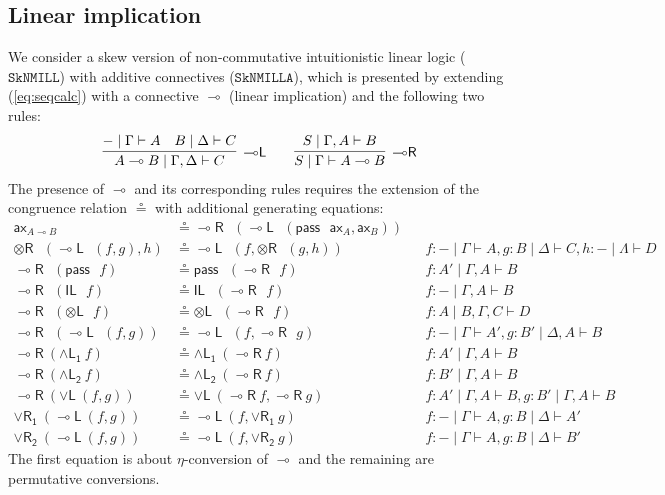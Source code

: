 \documentclass[submission,copyright,creativecommons]{eptcs}
\theoremstyle{definition}
\newcommand{\tl}{\otimes \mathsf{L}}
\newcommand{\tr}{\otimes \mathsf{R}}
\newcommand{\lright}{{\multimap}\mathsf{R}}
\newcommand{\lleft}{{\multimap}\mathsf{L}}
\newcommand{\pass}{\mathsf{pass}}
\newcommand{\unitl}{\mathsf{IL}}
\newcommand{\andlone}{\land \mathsf{L_{1}}}
\newcommand{\andltwo}{\land \mathsf{L_{2}}}
\newcommand{\orl}{\lor \mathsf{L}}
\newcommand{\orrone}{\lor \mathsf{R_{1}}}
\newcommand{\orrtwo}{\lor \mathsf{R_{2}}}
\newcommand{\ax}{\mathsf{ax}}
\newcommand{\lolli}{\multimap}
\newcommand{\SkNMILL}{$\mathtt{SkNMILL}$}
\newcommand{\SkNMILLA}{$\mathtt{SkNMILLA}$}
\begin{document}
\subsection{Linear implication}\label{subsec:impl}
We consider a skew version of non-commutative intuitionistic linear logic (\SkNMILL) with additive connectives (\SkNMILLA), which is presented by extending (\ref{eq:seqcalc}) with a connective $\lolli$ (linear implication) and the following two rules:
\begin{displaymath}
  \begin{array}{c}
    \infer[\lleft]{A \lolli B \mid \Gamma , \Delta \vdash C}{
      - \mid \Gamma \vdash A
      &
      B \mid \Delta \vdash C
    }
    \qquad
    \infer[\lright]{S \mid \Gamma \vdash A \lolli B}{S \mid \Gamma , A \vdash B}
  \end{array}
\end{displaymath}
The presence of $\lolli$ and its corresponding rules requires the extension of the congruence relation $\circeq$ with additional generating equations:
\begin{equation}\label{fig:circeq:impl}
  \begin{array}{rlll}
  \ax_{A \lolli B} &\circeq \lright \text{ } (\lleft \text{ } (\pass \text{ } \ax_{A}, \ax_{B} ))
  \\
  \tr \text{ } (\lleft \text{ } (f , g), h) & \circeq \lleft \text{ } (f, \tr \text{ } (g, h)) &&f: {-} \mid \Gamma \vdash A, g : B \mid \Delta \vdash C, h : {-} \mid \Lambda \vdash D
  \\
  \lright \text{ } (\pass \text{ } f) &\circeq \pass \text{ } (\lright \text{ } f) &&f : A' \mid \Gamma , A \vdash B
  \\
  \lright \text{ } (\unitl \text{ } f) &\circeq \unitl \text{ } (\lright \text{ } f) &&f : {-} \mid \Gamma , A \vdash B
  \\
  \lright \text{ } (\tl \text{ } f) &\circeq \tl \text{ } (\lright \text{ } f) &&f : A \mid B , \Gamma , C \vdash D
  \\
  \lright \text{ } (\lleft \text{ } (f, g)) &\circeq \lleft \text{ } (f, \lright \text{ } g) &&f : {-} \mid \Gamma \vdash A', g : B' \mid \Delta , A \vdash B
  \\
  \lright \ (\andlone \ f) &\circeq \andlone \ (\lright \ f) &&f : A' \mid \Gamma , A \vdash B
  \\
  \lright \ (\andltwo \ f) &\circeq \andltwo \ (\lright \ f) &&f : B' \mid \Gamma , A \vdash B
  \\
  \lright \ (\orl \ (f ,g)) &\circeq \orl \ (\lright \ f , \lright \ g) &&f : A' \mid \Gamma , A \vdash B , g : B' \mid \Gamma , A \vdash B
  \\
  \orrone \ (\lleft \  (f , g)) &\circeq \lleft \ (f , \orrone \ g) &&f : - \mid \Gamma \vdash A , g : B \mid \Delta \vdash A'
  \\
  \orrtwo \ (\lleft \  (f , g)) &\circeq \lleft \ (f , \orrtwo \ g) &&f : - \mid \Gamma \vdash A , g : B \mid \Delta \vdash B'
  \end{array}
\end{equation}
The first equation is about $\eta$-conversion of $\lolli$ and the remaining are permutative conversions.
\end{document}
